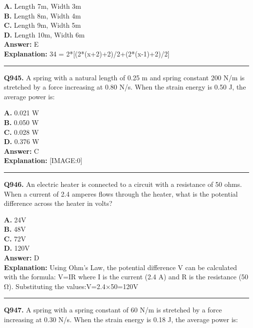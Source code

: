 \documentclass[12pt]{article}
\begin{document}
\textbf{A.} Length 7m, Width 3m \\
\textbf{B.} Length 8m, Width 4m \\
\textbf{C.} Length 9m, Width 5m \\
\textbf{D.} Length 10m, Width 6m \\

\textbf{Answer:} E \\
\textbf{Explanation:} 34 = 2*[(2*(x+2)+2)/2+(2*(x-1)+2)/2]

\hrule
\vspace{1em}


\noindent
\textbf{Q945.} A spring with a natural length of 0.25 m and spring constant 200 N/m is stretched by a force increasing at 0.80 N/s. When the strain energy is 0.50 J, the average power is:



\textbf{A.} 0.021 W \\
\textbf{B.} 0.050 W \\
\textbf{C.} 0.028 W \\
\textbf{D.} 0.376 W \\

\textbf{Answer:} C \\
\textbf{Explanation:} [IMAGE:0]

\hrule
\vspace{1em}


\noindent
\textbf{Q946.} An electric heater is connected to a circuit with a resistance of 50 ohms. When a current of 2.4 amperes flows through the heater, what is the potential difference across the heater in volts?



\textbf{A.} 24V \\
\textbf{B.} 48V \\
\textbf{C.} 72V \\
\textbf{D.} 120V \\

\textbf{Answer:} D \\
\textbf{Explanation:} Using Ohm's Law, the potential difference V can be calculated with the formula:
V=IR where I is the current (2.4 A) and R is the resistance (50 Ω). Substituting the values:V=2.4×50=120V

\hrule
\vspace{1em}


\noindent
\textbf{Q947.} A spring with a spring constant of 60 N/m is stretched by a force increasing at 0.30 N/s. When the strain energy is 0.18 J, the average power is:
\end{document}
